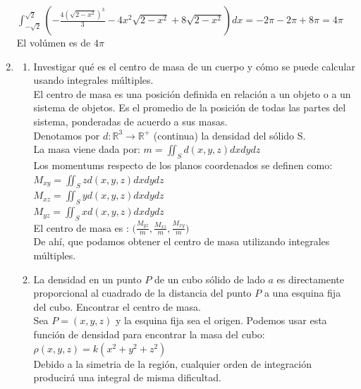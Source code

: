 \documentclass{article}
\begin{document}
\begin{enumerate}
{		
		$\int_{-\sqrt{2}}^{\sqrt{2}}(-\frac{4(\sqrt{2-x^2})^3}{3} -4x^2\sqrt{2-x^2} + 8\sqrt{2-x^2})dx = -2\pi -2\pi + 8\pi = 4\pi$\\
		
		El volúmen es de $4\pi $\\
		
    }
    
   \item {
    \begin{enumerate}
	\item
	Investigar qué es el centro de masa de un cuerpo y cómo se puede calcular usando integrales múltiples.\\	
	
	El centro de masa es una posición definida en relación a un objeto o a un sistema de objetos. Es el promedio de la posición de todas las partes del sistema, ponderadas de acuerdo a sus masas.\\
	
	Denotamos por $d : \mathbb{R}^3 \rightarrow \mathbb{R}^+$ (continua) la densidad del sólido S.\\
	
	La masa viene dada por:	$m = \iint_S d(x,y,z)dxdydz$\\
	
	Los momentums respecto de los planos coordenados se definen como:\\
	$M_{xy} = \iint_S zd(x,y,z)dxdydz$\\
	$M_{xz} = \iint_S yd(x,y,z)dxdydz$\\
	$M_{yz} = \iint_S xd(x,y,z)dxdydz$\\
	
	El centro de masa es : $\Big(\frac{M_{yz}}{m},\frac{M_{xz}}{m},\frac{M_{xy}}{m} \Big)$\\
	
	De ahí, que podamos obtener el centro de masa utilizando integrales múltiples.\\	
	
	\item    
	La densidad en un punto $P$ de un cubo sólido de lado $a$ es directamente proporcional al cuadrado de la distancia del punto $P$ a una esquina fija del cubo. Encontrar el centro de masa.\\    

Sea $P = (x,y,z)$ y la esquina fija sea el origen. Podemos usar esta función de densidad para encontrar la masa del cubo:\\
$\rho(x,y,z) = k(x^2 + y^2 + z^2)$\\
Debido a la simetria de la región, cualquier orden de integración producirá una integral de misma dificultad.\\


\end{enumerate}}
\end{enumerate}
\end{document}
